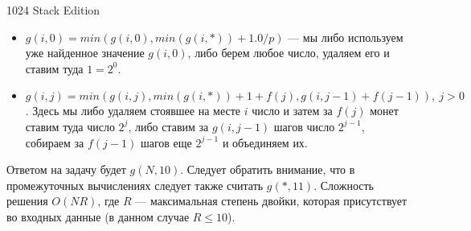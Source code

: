 \begin{problem}{1024 Stack Edition}
\begin{enumerate}
\begin{itemize}

\item $g(i, 0) = min( g(i, 0), min ( g(i, *) ) + 1.0 / p)$ --- мы либо используем уже найденное значение $g(i, 0)$, либо берем любое число, удаляем его и ставим туда $1 = 2^0$.
    
\item $g(i, j) = min( g(i, j), min ( g(i, *) ) + 1 + f(j), g(i, j - 1) + f(j - 1) ),~j > 0$. Здесь мы либо удаляем стоявшее на месте $i$ число и затем за $f(j)$ монет ставим туда число $2^j$, либо ставим за $g(i, j - 1)$ шагов число $2^{j-1}$, собираем за $f(j-1)$ шагов еще $2^{j-1}$ и объединяем их.

\end{itemize}
\end{enumerate}

Ответом на задачу будет $g(N, 10)$. Следует обратить внимание, что в промежуточных вычислениях следует также считать $g(*, 11)$. Сложность решения $O(NR)$, где $R$ --- максимальная степень двойки, которая присутствует во входных данные (в данном случае $R \le 10$).

\end{problem}
